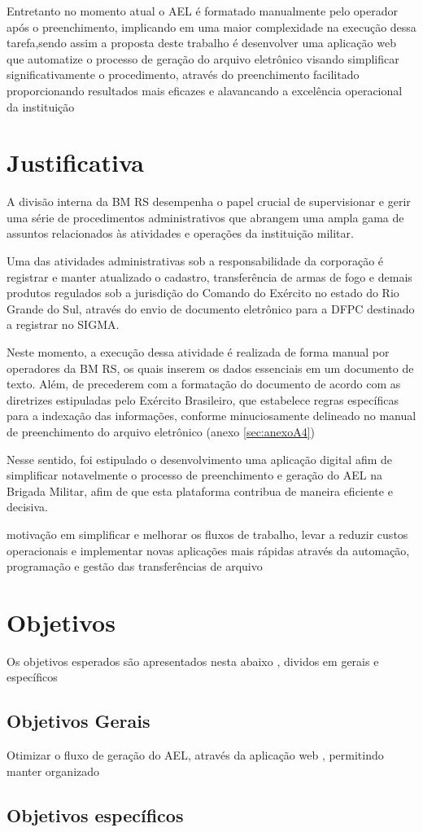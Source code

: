 Entretanto no momento atual o AEL é formatado manualmente pelo operador após o preenchimento, implicando em uma maior complexidade na execução dessa tarefa,sendo assim a proposta deste trabalho é desenvolver uma aplicação web que automatize o processo de geração do arquivo eletrônico visando simplificar significativamente o procedimento, através do preenchimento facilitado proporcionando resultados mais eficazes e alavancando a excelência operacional da instituição


\section{Justificativa}

A divisão interna da BM RS desempenha o papel crucial de supervisionar e gerir uma série de procedimentos administrativos que abrangem uma ampla gama de assuntos relacionados às atividades e operações da instituição militar. \cite{bmDepartamentoAdministrativo}

Uma das atividades administrativas sob a responsabilidade da corporação é registrar e manter atualizado o cadastro, transferência de armas de fogo e demais produtos regulados sob a jurisdição do Comando do Exército no estado do Rio Grande do Sul, através do envio de documento eletrônico para a DFPC destinado a registrar no SIGMA.\cite{ExércitoBrasileiro}

Neste momento, a execução dessa atividade é realizada de forma manual por operadores da BM RS, os quais inserem os dados essenciais em um documento de texto. Além, de precederem com a formatação do documento de acordo com as diretrizes estipuladas pelo Exército Brasileiro, que estabelece regras específicas para a indexação das informações, conforme minuciosamente delineado no manual de preenchimento do arquivo eletrônico (anexo \ref{sec:anexoA4})   

Nesse sentido, foi estipulado o desenvolvimento uma aplicação digital afim de simplificar notavelmente o processo de preenchimento e geração do AEL na Brigada Militar, afim de que esta plataforma contribua de maneira eficiente e decisiva.
\begin{citacao}
    motivação em simplificar e melhorar os fluxos de trabalho, levar a reduzir custos operacionais e implementar novas aplicações mais rápidas através da automação, programação e gestão das transferências de arquivo\cite{AndradeJunior}
    \end{citacao}

\section{Objetivos}
Os objetivos esperados são apresentados nesta abaixo , dividos em gerais e específicos 

\subsection{Objetivos Gerais}
Otimizar o fluxo de geração do AEL, através da aplicação web , permitindo manter organizado 

\subsection{Objetivos específicos}
